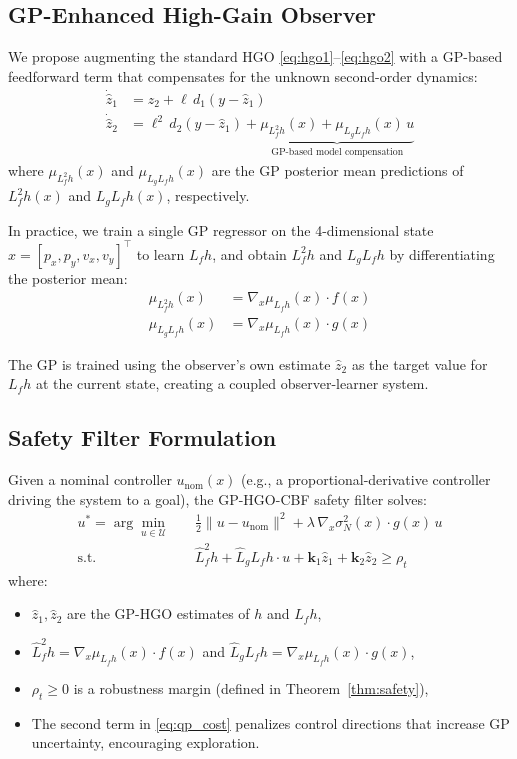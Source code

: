 \documentclass[letterpaper, 10 pt, conference]{ieeeconf}
\begin{document}
\subsection{GP-Enhanced High-Gain Observer}

We propose augmenting the standard HGO \eqref{eq:hgo1}--\eqref{eq:hgo2} with a GP-based feedforward term that compensates for the unknown second-order dynamics:
\begin{align}
    \dot{\hat{z}}_1 &= \hat{z}_2 + \ell \, d_1 (y - \hat{z}_1) \label{eq:gphgo1}\\
    \dot{\hat{z}}_2 &= \ell^2 \, d_2 (y - \hat{z}_1) + \underbrace{\mu_{L_f^2 h}(x) + \mu_{L_g L_f h}(x) \, u}_{\text{GP-based model compensation}} \label{eq:gphgo2}
\end{align}
where $\mu_{L_f^2 h}(x)$ and $\mu_{L_g L_f h}(x)$ are the GP posterior mean predictions of $L_f^2 h(x)$ and $L_g L_f h(x)$, respectively.

In practice, we train a single GP regressor on the 4-dimensional state $x = [p_x, p_y, v_x, v_y]^\top$ to learn $L_f h$, and obtain $L_f^2 h$ and $L_g L_f h$ by differentiating the posterior mean:
\begin{align}
    \mu_{L_f^2 h}(x) &= \nabla_x \mu_{L_f h}(x) \cdot f(x) \label{eq:Lffh_gp}\\
    \mu_{L_g L_f h}(x) &= \nabla_x \mu_{L_f h}(x) \cdot g(x) \label{eq:Lgfh_gp}
\end{align}

The GP is trained using the observer's own estimate $\hat{z}_2$ as the target value for $L_f h$ at the current state, creating a coupled observer-learner system.

\subsection{Safety Filter Formulation}

Given a nominal controller $u_{\text{nom}}(x)$ (e.g., a proportional-derivative controller driving the system to a goal), the GP-HGO-CBF safety filter solves:
\begin{align}
    u^* = \arg\min_{u \in \mathcal{U}} \quad & \frac{1}{2}\|u - u_{\text{nom}}\|^2 + \lambda \, \nabla_x \sigma_{N}^2(x) \cdot g(x) \, u \label{eq:qp_cost}\\
    \text{s.t.} \quad & \hat{L}_f^2 h + \hat{L}_g L_f h \cdot u + \bm{k}_1 \hat{z}_1 + \bm{k}_2 \hat{z}_2 \geq \rho_t \label{eq:qp_cons}
\end{align}
where:
\begin{itemize}
    \item $\hat{z}_1, \hat{z}_2$ are the GP-HGO estimates of $h$ and $L_f h$,
    \item $\hat{L}_f^2 h = \nabla_x \mu_{L_f h}(x) \cdot f(x)$ and $\hat{L}_g L_f h = \nabla_x \mu_{L_f h}(x) \cdot g(x)$,
    \item $\rho_t \geq 0$ is a robustness margin (defined in Theorem~\ref{thm:safety}),
    \item The second term in \eqref{eq:qp_cost} penalizes control directions that increase GP uncertainty, encouraging exploration.
\end{itemize}
\end{document}
